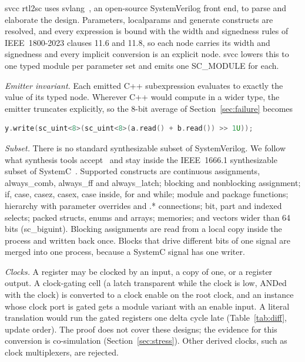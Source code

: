 \documentclass[conference]{IEEEtran}
\newcommand{\code}[1]{{\fontshape{n}\ttfamily #1}}
\begin{document}
\code{svcc rtl2sc} uses \code{svlang}~\cite{kubavat2026svlang}, an open-source SystemVerilog front
end, to parse and elaborate the design. Parameters, \code{localparam}s and generate constructs are
resolved, and every expression is bound with the width and signedness rules of IEEE~1800-2023
clauses 11.6 and 11.8, so each node carries its width and signedness and every implicit
conversion is an explicit node. \code{svcc} lowers this to one typed module per parameter set and
emits one \code{SC\_MODULE} for each.

\emph{Emitter invariant.} Each emitted C++ subexpression evaluates to exactly the value of its
typed node. Wherever C++ would compute in a wider type, the emitter truncates explicitly, so the
8-bit average of Section~\ref{sec:failure} becomes
\begin{lstlisting}[language=C++]
y.write(sc_uint<8>(sc_uint<8>(a.read() + b.read()) >> 1U));
\end{lstlisting}

\emph{Subset.} There is no standard synthesizable subset of SystemVerilog. We follow what
synthesis tools accept~\cite{sutherland2014synth} and stay inside the IEEE~1666.1 synthesizable
subset of SystemC~\cite{ieee1666_1_2016}. Supported constructs are continuous assignments,
\code{always\_comb}, \code{always\_ff} and \code{always\_latch}; blocking and nonblocking
assignment; \code{if}, \code{case}, \code{casez}, \code{casex}, \code{case inside}, \code{for} and
\code{while}; module and package functions; hierarchy with parameter overrides and \code{.*}
connections; bit, part and indexed selects; packed structs, enums and arrays; memories; and vectors
wider than 64 bits (\code{sc\_biguint}). Blocking assignments are read from a local copy inside the
process and written back once. Blocks that drive different bits of one signal are merged into one
process, because a SystemC signal has one writer.

\emph{Clocks.} A register may be clocked by an input, a copy of one, or a register output. A
clock-gating cell (a latch transparent while the clock is low, ANDed with the clock) is converted
to a clock enable on the root clock, and an instance whose clock port is gated gets a module variant
with an enable input. A literal translation would run the gated registers one delta cycle late
(Table~\ref{tab:diff}, update order). The proof does not cover these designs; the evidence for
this conversion is co-simulation (Section~\ref{sec:stress}). Other derived clocks, such as clock
multiplexers, are rejected.
\end{document}
